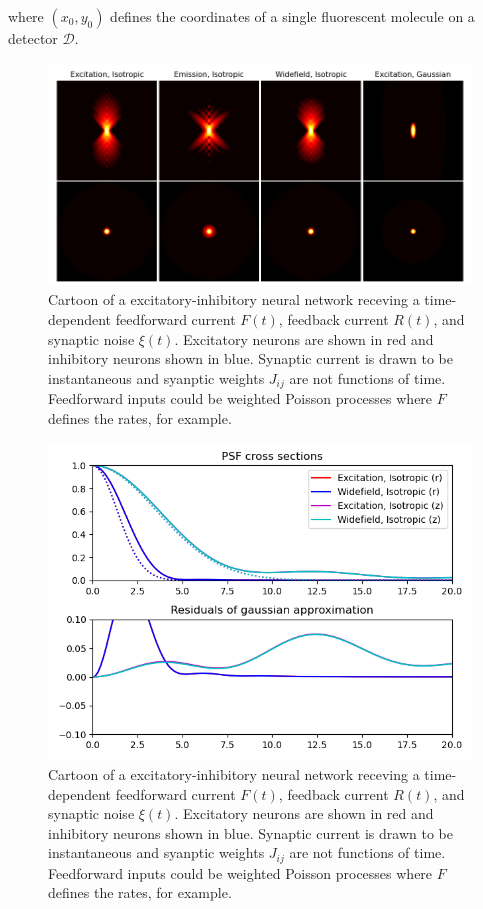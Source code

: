 \documentclass{ucetd}
\begin{document}
where $(x_0,y_0)$ defines the coordinates of a single fluorescent molecule on a detector $\mathcal{D}$. 

\begin{figure}[t!]
\centering
\includegraphics[width=150mm]{psf-1}
\caption{Cartoon of a excitatory-inhibitory neural network receving a time-dependent feedforward current $F(t)$, feedback current $R(t)$, and synaptic noise $\xi(t)$. Excitatory neurons are shown in red and inhibitory neurons shown in blue. Synaptic current is drawn to be instantaneous and syanptic weights $J_{ij}$ are not functions of time. Feedforward inputs could be weighted Poisson processes where $F$ defines the rates, for example.}
\end{figure}

\begin{figure}[t!]
\centering
\includegraphics[width=150mm]{psf-2}
\caption{Cartoon of a excitatory-inhibitory neural network receving a time-dependent feedforward current $F(t)$, feedback current $R(t)$, and synaptic noise $\xi(t)$. Excitatory neurons are shown in red and inhibitory neurons shown in blue. Synaptic current is drawn to be instantaneous and syanptic weights $J_{ij}$ are not functions of time. Feedforward inputs could be weighted Poisson processes where $F$ defines the rates, for example.}
\end{figure}
\end{document}
